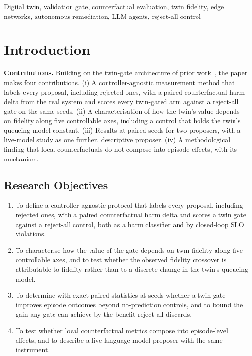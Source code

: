 \documentclass[conference]{IEEEtran}
\begin{document}
\begin{IEEEkeywords}
Digital twin, validation gate, counterfactual evaluation, twin fidelity, edge networks, autonomous remediation, LLM agents, reject-all control
\end{IEEEkeywords}

\section{Introduction}


\textbf{Contributions.} Building on the twin-gate architecture of prior work~\cite{aether,processplant,twingatedorch}, the paper makes four contributions. (i) A controller-agnostic measurement method that labels every proposal, including rejected ones, with a paired counterfactual harm delta from the real system and scores every twin-gated arm against a reject-all gate on the same seeds. (ii) A characterisation of how the twin's value depends on fidelity along five controllable axes, including a control that holds the twin's queueing model constant. (iii) Results at \NSeeds{} paired seeds for two proposers, with a live-model study as one further, descriptive proposer. (iv) A methodological finding that local counterfactuals do not compose into episode effects, with its mechanism.

\subsection{Research Objectives}

\begin{enumerate}
  \renewcommand{\labelenumi}{\textbf{RO\arabic{enumi}.}}
  \item To define a controller-agnostic protocol that labels every proposal, including rejected ones, with a paired counterfactual harm delta and scores a twin gate against a reject-all control, both as a harm classifier and by closed-loop SLO violations.
  \item To characterise how the value of the gate depends on twin fidelity along five controllable axes, and to test whether the observed fidelity crossover is attributable to fidelity rather than to a discrete change in the twin's queueing model.
  \item To determine with exact paired statistics at \NSeeds{} seeds whether a twin gate improves episode outcomes beyond no-prediction controls, and to bound the gain any gate can achieve by the benefit reject-all discards.
  \item To test whether local counterfactual metrics compose into episode-level effects, and to describe a live language-model proposer with the same instrument.
\end{enumerate}
\end{document}
